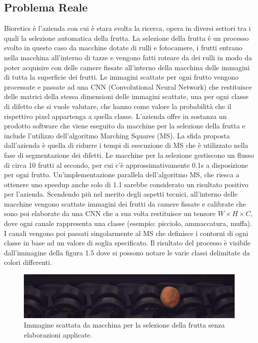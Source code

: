 \documentclass[12pt,a4paper]{report}
\begin{document}
\subsection{Problema Reale}
Bioretics è l'azienda con cui è stara svolta la ricerca, opera in diversi settori tra i quali la selezione automatica della frutta. La selezione della frutta è un processo svolto in questo caso da macchine dotate di rulli e fotocamere, i frutti entrano nella macchina all'interno di tazze e vengono fatti roteare da dei rulli in modo da poter acquisire con delle camere fissate all'interno della macchina delle immagini di tutta la superficie dei frutti. Le immagini scattate per ogni frutto vengono processate e passate ad una CNN (Convolutional Neural Network) che restituisce delle matrici della stessa dimensioni delle immagini scattate, una per ogni classe di difetto che si vuole valutare, che hanno come valore la probabilità che il rispettivo pixel appartenga a quella classe. \newline
L'azienda offre in sostanza un prodotto software che viene eseguito da macchine per la selezione della frutta e include l’utilizzo dell'algoritmo Marching Squares (MS). La sfida proposta dall'azienda è quella di ridurre i tempi di esecuzione di MS che è utilizzato nella fase di segmentazione dei difetti.
Le macchine per la selezione gestiscono un flusso di circa 10 frutti al secondo, per cui c'è approssimativamente 0.1s a disposizione per ogni frutto. Un’implementazione parallela dell’algoritmo MS, che riesca a ottenere uno speedup anche solo di 1.1 sarebbe considerato un risultato positivo per l’azienda.
Scendendo più nel merito degli aspetti tecnici, all’interno delle macchine vengono scattate immagini dei frutti da camere fissate e calibrate che sono poi elaborate da una CNN che a sua volta restituisce un tensore $W\times H\times C$, dove ogni canale rappresenta una classe (esempio: picciolo, ammaccatura, muffa).
I canali vengono poi passati singolarmente al MS che definisce i contorni di ogni classe in base ad un valore di soglia specificato. Il risultato del processo è visibile dall’immagine della figura 1.5 dove si possono notare le varie classi delimitate da colori differenti. \newline
\begin{figure}[H]
    \centering
    \includegraphics[scale=0.25]{img/marching_squares_00000052_00000001.png}
    \caption{Immagine scattata da macchina per la selezione della frutta senza elaborazioni applicate.}
\end{figure} 
\end{document}
